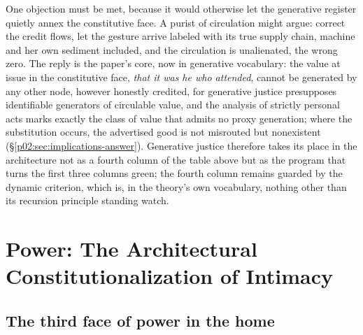 One objection must be met, because it would otherwise let the generative register quietly annex the constitutive face. A purist of circulation might argue: correct the credit flows, let the gesture arrive labeled with its true supply chain, machine and her own sediment included, and the circulation is unalienated, the wrong zero. The reply is the paper's core, now in generative vocabulary: the value at issue in the constitutive face, \emph{that it was he who attended}, cannot be generated by any other node, however honestly credited, for generative justice presupposes identifiable generators of circulable value, and the analysis of strictly personal acts marks exactly the class of value that admits no proxy generation; where the substitution occurs, the advertised good is not misrouted but nonexistent (\S\ref{p02:sec:implications-answer}). Generative justice therefore takes its place in the architecture not as a fourth column of the table above but as the program that turns the first three columns green; the fourth column remains guarded by the dynamic criterion, which is, in the theory's own vocabulary, nothing other than its recursion principle standing watch.

\section{Power: The Architectural Constitutionalization of Intimacy}
\label{p02:sec:power}

\subsection{The third face of power in the home}
\label{p02:sec:power-faces}

